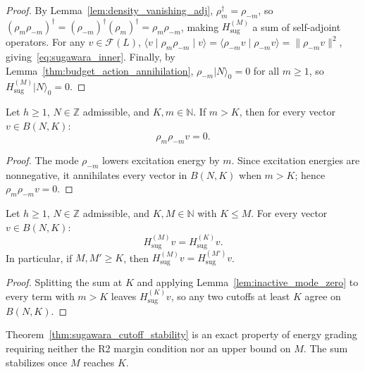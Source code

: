 \begin{proof}
By Lemma~\ref{lem:density_vanishing_adj}, $\rho_m^\dagger = \rho_{-m}$, so $(\rho_m \rho_{-m})^\dagger = (\rho_{-m})^\dagger (\rho_m)^\dagger = \rho_m \rho_{-m}$, making $H_{\mathrm{sug}}^{(M)}$ a sum of self-adjoint operators.
For any $v \in \mathcal{F}(L)$, $\langle v \mid \rho_m \rho_{-m} \mid v \rangle = \langle \rho_{-m} v \mid \rho_{-m} v \rangle = \|\rho_{-m} v\|^2$, giving~\eqref{eq:sugawara_inner}.
Finally, by Lemma~\ref{thm:budget_action_annihilation}, $\rho_{-m} |N\rangle_0 = 0$ for all $m \ge 1$, so $H_{\mathrm{sug}}^{(M)} |N\rangle_0 = 0$.
\end{proof}

\begin{lemma}
\label{lem:inactive_mode_zero}
Let $h \ge 1$, $N \in \mathbb{Z}$ admissible, and $K, m \in \mathbb{N}$. If $m > K$, then for every vector $v \in B(N, K)$:
\begin{equation}
\rho_m \rho_{-m} v = 0.
\end{equation}
\end{lemma}
\begin{proof}
The mode $\rho_{-m}$ lowers excitation energy by $m$. Since excitation
energies are nonnegative, it annihilates every vector in $B(N,K)$ when
$m>K$; hence $\rho_m\rho_{-m}v=0$.
\end{proof}

\begin{theorem}
\label{thm:sugawara_cutoff_stability}
Let $h \ge 1$, $N \in \mathbb{Z}$ admissible, and $K, M \in \mathbb{N}$ with $K \le M$. For every vector $v \in B(N, K)$:
\begin{equation}
H_{\mathrm{sug}}^{(M)} v = H_{\mathrm{sug}}^{(K)} v.
\end{equation}
In particular, if $M, M' \ge K$, then $H_{\mathrm{sug}}^{(M)} v = H_{\mathrm{sug}}^{(M')} v$.
\end{theorem}

\begin{proof}
Splitting the sum at $K$ and applying Lemma~\ref{lem:inactive_mode_zero}
to every term with $m>K$ leaves $H_{\mathrm{sug}}^{(K)}v$, so any two
cutoffs at least $K$ agree on $B(N,K)$.
\end{proof}

\begin{remark}
Theorem~\ref{thm:sugawara_cutoff_stability} is an exact property of energy grading requiring neither the R2 margin condition nor an upper bound on $M$. The sum stabilizes once $M$ reaches $K$.
\end{remark}

